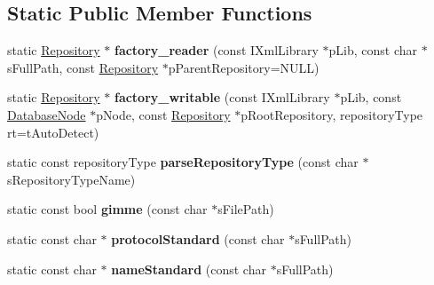 \subsection*{\-Static \-Public \-Member \-Functions}
\begin{DoxyCompactItemize}
\item 
\hypertarget{classgeneral__server_1_1Repository_ac8eb379e0435c8a78bac0083de860de7}{static \hyperlink{classgeneral__server_1_1Repository}{\-Repository} $\ast$ {\bfseries factory\-\_\-reader} (const \-I\-Xml\-Library $\ast$p\-Lib, const char $\ast$s\-Full\-Path, const \hyperlink{classgeneral__server_1_1Repository}{\-Repository} $\ast$p\-Parent\-Repository=\-N\-U\-L\-L)}\label{classgeneral__server_1_1Repository_ac8eb379e0435c8a78bac0083de860de7}

\item 
\hypertarget{classgeneral__server_1_1Repository_a6dae0298dc3e6485355f98c106082e24}{static \hyperlink{classgeneral__server_1_1Repository}{\-Repository} $\ast$ {\bfseries factory\-\_\-writable} (const \-I\-Xml\-Library $\ast$p\-Lib, const \hyperlink{classgeneral__server_1_1DatabaseNode}{\-Database\-Node} $\ast$p\-Node, const \hyperlink{classgeneral__server_1_1Repository}{\-Repository} $\ast$p\-Root\-Repository, repository\-Type rt=t\-Auto\-Detect)}\label{classgeneral__server_1_1Repository_a6dae0298dc3e6485355f98c106082e24}

\item 
\hypertarget{classgeneral__server_1_1Repository_a802f9c9f3b961574bfce0469177d4a0f}{static const repository\-Type {\bfseries parse\-Repository\-Type} (const char $\ast$s\-Repository\-Type\-Name)}\label{classgeneral__server_1_1Repository_a802f9c9f3b961574bfce0469177d4a0f}

\item 
\hypertarget{classgeneral__server_1_1Repository_a9910a1064e9b51a999824cd9d7499210}{static const bool {\bfseries gimme} (const char $\ast$s\-File\-Path)}\label{classgeneral__server_1_1Repository_a9910a1064e9b51a999824cd9d7499210}

\item 
\hypertarget{classgeneral__server_1_1Repository_a22d4a72dd3babc2ab494f58bef0f06ce}{static const char $\ast$ {\bfseries protocol\-Standard} (const char $\ast$s\-Full\-Path)}\label{classgeneral__server_1_1Repository_a22d4a72dd3babc2ab494f58bef0f06ce}

\item 
\hypertarget{classgeneral__server_1_1Repository_a7e09f5c41f0a7155eddde5b49cbfe0e9}{static const char $\ast$ {\bfseries name\-Standard} (const char $\ast$s\-Full\-Path)}\label{classgeneral__server_1_1Repository_a7e09f5c41f0a7155eddde5b49cbfe0e9}


\end{DoxyCompactItemize}
